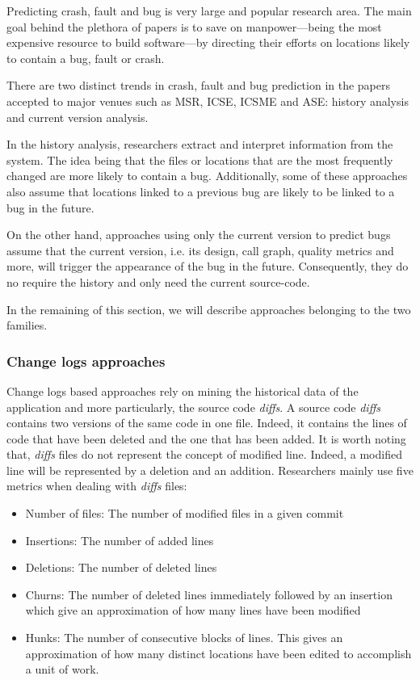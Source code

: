 Predicting crash, fault and bug is very large and popular research area.
The main goal behind the plethora of papers is to save on manpower---being the most expensive resource to build software---by directing their efforts on locations likely to contain a bug, fault or crash.

There are two distinct trends in crash, fault and bug prediction in the papers accepted to major venues such as MSR, ICSE, ICSME and ASE:  history analysis and current version analysis.

In the history analysis, researchers extract and interpret information from  the system.
The idea being that the files or locations that are the most frequently changed are more likely to contain a bug.
Additionally, some of these approaches also assume that locations linked to a previous bug are likely to be linked to a bug in the future.

On the other hand, approaches using only the current version to predict bugs assume that the current version, i.e. its design, call graph, quality metrics and more, will trigger the appearance of the bug in the future.
Consequently, they do no require the history and only need the current source-code.

In the remaining of this section, we will describe approaches belonging to the two families.

\subsubsection{Change logs approaches}
\label{subs:Change logs approaches}

Change logs based approaches rely on mining the historical data of the application and more particularly, the source code \textit{diffs}.
A source code \textit{diffs} contains two versions of the same code in one file.
Indeed, it contains the lines of code that have been deleted and the one that has been added.
It is worth noting that, \textit{diffs} files do not represent the concept of modified line.
Indeed, a modified line will be represented by a deletion and an addition.
Researchers mainly use five metrics when dealing with \textit{diffs} files:

\begin{itemize}
  \item Number of files: The number of modified files in a given commit
  \item Insertions: The number of added lines
  \item Deletions: The number of deleted lines
  \item Churns: The number of deleted lines immediately followed by an insertion which give an approximation of how many lines have been modified
  \item Hunks: The number of consecutive blocks of lines. This gives an approximation of how many distinct locations have been edited to accomplish a unit of work.
\end{itemize}

